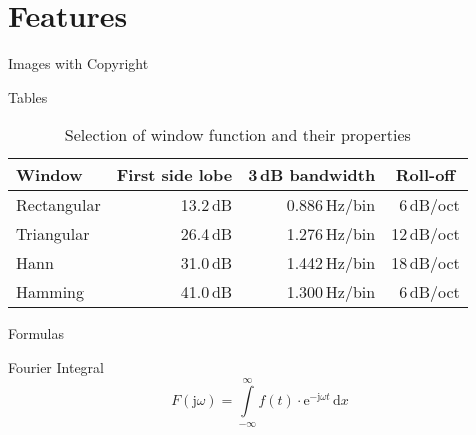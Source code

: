 \documentclass[compress,PxFont]{beamer}
\begin{document}
%
%
\section{Features}


\begin{frame}{Images with Copyright}
	\begin{figure}
		\centering
	\end{figure}
\end{frame}


\begin{frame}{Tables}
\begin{table}[]
	\caption{Selection of window function and their properties}
	\begin{tabular}[]{lrrr}
		\toprule
		\textbf{Window}			& \multicolumn{1}{c}{\textbf{First side lobe}}	
		                    & \multicolumn{1}{c}{\textbf{3\,dB bandwidth}}
		                    & \multicolumn{1}{c}{\textbf{Roll-off}} \\
		\midrule
		Rectangular				& 13.2\,dB	& 0.886\,Hz/bin	& 6\,dB/oct		\\[0.25em]
		Triangular				& 26.4\,dB	& 1.276\,Hz/bin	& 12\,dB/oct	\\[0.25em]
		Hann					& 31.0\,dB	& 1.442\,Hz/bin	& 18\,dB/oct	\\[0.25em]
		Hamming					& 41.0\,dB	& 1.300\,Hz/bin	& 6\,dB/oct		\\
		\bottomrule
	\end{tabular}
	\label{tab:WindowFunctions}
\end{table}
\end{frame}


\begin{frame}{Formulas}
\begin{block}{Fourier Integral}
\[
F(\textrm{j}\omega) = \displaystyle \int \limits_{-\infty}^{\infty} \! f(t)\cdot\textrm{e}^{-\textrm{j}\omega t}  \, \mathrm{d} x
\]
\end{block}
\end{frame}
\end{document}

